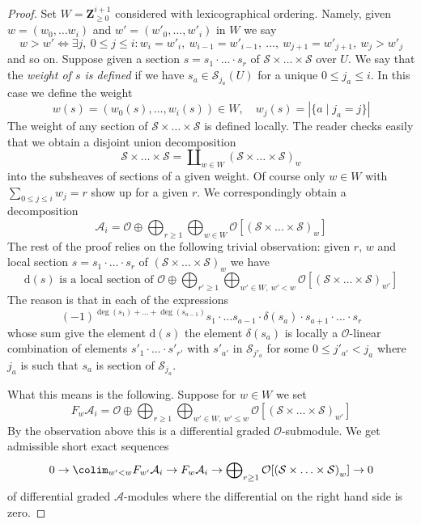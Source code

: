 \begin{proof}
\medskip\noindent
Set $W = \mathbf{Z}_{\geq 0}^{i + 1}$ considered with lexicographical
ordering. Namely, given $w = (w_0, \ldots w_i)$ and
$w' = (w'_0, \ldots, w'_i)$ in $W$ we say
$$
w > w' \Leftrightarrow
\exists j,\ 0 \leq j \leq i :
w_i = w'_i,\ w_{i - 1} = w'_{i - 1},\ \ldots ,
\ w_{j + 1} = w'_{j + 1},\ w_j > w'_j
$$
and so on. Suppose given a section
$s = s_1 \cdot \ldots \cdot s_r$ of
$\mathcal{S} \times \ldots \times \mathcal{S}$
over $U$. We say that the {\it weight of $s$ is defined}
if we have $s_a \in \mathcal{S}_{j_a}(U)$ for a unique
$0 \leq j_a \leq i$. In this case we define the weight
$$
w(s) = (w_0(s), \ldots, w_i(s)) \in W,\quad
w_j(s) = |\{a \mid j_a = j\}|
$$
The weight of any section of $\mathcal{S} \times \ldots \times \mathcal{S}$
is defined locally. The reader checks easily that we obtain a disjoint union
decomposition
$$
\mathcal{S} \times \ldots \times \mathcal{S} =
\coprod\nolimits_{w \in W} \left(
\mathcal{S} \times \ldots \times \mathcal{S}\right)_w
$$
into the subsheaves of sections of a given weight. Of course
only $w \in W$ with $\sum_{0 \leq j \leq i} w_j = r$ show up for a given $r$.
We correspondingly obtain a decomposition
$$
\mathcal{A}_i = \mathcal{O} \oplus
\bigoplus\nolimits_{r \geq 1}
\bigoplus\nolimits_{w \in W}
\mathcal{O}[\left(\mathcal{S} \times \ldots \times \mathcal{S}\right)_w]
$$
The rest of the proof relies on the following trivial observation:
given $r$, $w$ and local section $s = s_1 \cdot \ldots \cdot s_r$ of
$\left(\mathcal{S} \times \ldots \times \mathcal{S}\right)_w$
we have
$$
\text{d}(s) \text{ is a local section of } \mathcal{O} \oplus
\bigoplus\nolimits_{r' \geq 1}
\bigoplus\nolimits_{w' \in W,\ w' < w}
\mathcal{O}[\left(\mathcal{S} \times \ldots \times \mathcal{S}\right)_{w'}]
$$
The reason is that in each of the expressions
$$
(-1)^{\deg(s_1) + \ldots + \deg(s_{a - 1})}
s_1 \cdot \ldots s_{a - 1} \cdot \delta(s_a) \cdot
s_{a + 1} \cdot \ldots \cdot s_r
$$
whose sum give the element $\text{d}(s)$ the element $\delta(s_a)$
is locally a $\mathcal{O}$-linear combination of elements
$s'_1 \cdot \ldots \cdot s'_{r'}$ with $s'_{a'}$ in
$\mathcal{S}_{j'_a}$ for some $0 \leq j'_{a'} < j_a$ where $j_a$ is such that
$s_a$ is section of $\mathcal{S}_{j_a}$.

\medskip\noindent
What this means is the following. Suppose for $w \in W$ we set
$$
F_w \mathcal{A}_i = \mathcal{O} \oplus \bigoplus\nolimits_{r \geq 1}
\bigoplus\nolimits_{w' \in W,\ w' \leq w}
\mathcal{O}[\left(\mathcal{S} \times \ldots \times \mathcal{S}\right)_{w'}]
$$
By the observation above this is a differential graded $\mathcal{O}$-submodule.
We get admissible short exact sequences
$$
0 \to \colim_{w' < w} F_{w'}\mathcal{A}_i \to
F_w\mathcal{A}_i \to
\bigoplus\nolimits_{r \geq 1}
\mathcal{O}[\left(\mathcal{S} \times \ldots \times \mathcal{S}\right)_w]
\to 0
$$
of differential graded $\mathcal{A}$-modules where the differential
on the right hand side is zero.


\end{proof}
